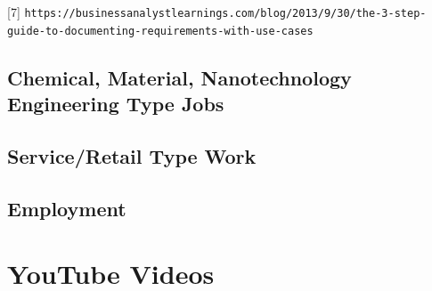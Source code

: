 \documentclass{article}
\begin{document}
\hspace{-0.63cm} [7] \texttt{https://businessanalystlearnings.com/blog/2013/9/30/the-3-step-guide-to-documenting-requirements-with-use-cases}

\newpage

\subsection{Chemical, Material, Nanotechnology Engineering Type Jobs}

\newpage 

\subsection{Service/Retail Type Work}

\newpage 

\subsection{Employment}

\newpage 

\section{YouTube Videos} 
\end{document}
